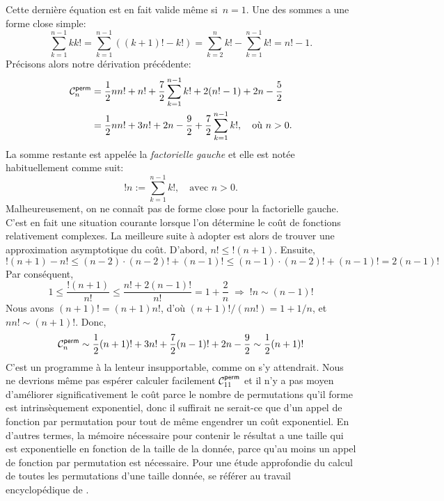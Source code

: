 Cette dernière équation est en fait valide même si~\(n = 1\). Une des
sommes a une forme close simple:
\begin{equation*}
\sum_{k=1}^{n-1}{kk!} = \sum_{k=1}^{n-1}((k+1)! - k!) =
\sum_{k=2}^{n}{k!} - \sum_{k=1}^{n-1}{k!} = n! - 1.
\end{equation*}
Précisons alors notre dérivation précédente:
\begin{align*}
\C{\fun{perm}}{n}
  &= \frac{1}{2}{nn!} + n! + \frac{7}{2}\sum_{k=1}^{n-1}{k!}
     + 2(n! - 1) + 2n - \frac{5}{2}\\
  &= \frac{1}{2}{nn!} + 3n!
     + 2n - \frac{9}{2} + \frac{7}{2}\sum_{k=1}^{n-1}{k!},\quad
     \text{où \(n > 0\)}.
\end{align*}
La somme restante est appelée la \emph{factorielle gauche}
\citep{Kurepa_1971} et elle est notée
habituellement comme suit:
\begin{equation*}
!n := \sum_{k=1}^{n-1}{k!},\quad \text{avec \(n > 0\)}.
\end{equation*}
Malheureusement, on ne connaît pas de forme close pour la factorielle
gauche.  C'est en fait une situation courante lorsque l'on détermine
le coût de fonctions relativement complexes. La meilleure suite à
adopter est alors de trouver une approximation asymptotique du
coût. D'abord, \(n!  \leqslant !(n+1)\). Ensuite,
\begin{equation*}
!(n+1) - n! \leqslant (n-2) \cdot (n-2)! + (n-1)! \leqslant
(n-1) \cdot (n-2)! + (n-1)! = 2 (n-1)!
\end{equation*}
Par conséquent,
\begin{equation*}
1 \leqslant \frac{!(n+1)}{n!} \leqslant \frac{n! + 2(n-1)!}{n!} = 1 +
\frac{2}{n} \;\Rightarrow\; !n \sim (n-1)!
\end{equation*}
Nous avons \((n+1)! = (n+1)n!\), d'où \((n+1)!/(nn!) = 1 + 1/n\), et
\(nn!  \sim (n+1)!\). Donc,
\begin{equation*}
\abovedisplayshortskip=0pt
\abovedisplayskip=0pt
\C{\fun{perm}}{n} \sim \frac{1}{2}(n+1)! + 3n! + \frac{7}{2}(n-1)!
+ 2n - \frac{9}{2} \sim \frac{1}{2}(n+1)!
\end{equation*}
C'est un programme à la lenteur insupportable, comme on s'y
attendrait. Nous ne devrions même pas espérer calculer facilement
\(\C{\fun{perm}}{11}\)  et il n'y a
pas moyen d'améliorer significativement le coût parce le nombre de
permutations qu'il forme est intrinsèquement exponentiel, donc il
suffirait ne serait-ce que d'un appel de fonction par permutation pour
tout de même engendrer un coût exponentiel. En d'autres termes, la
mémoire nécessaire pour contenir le résultat a une taille qui est
exponentielle en fonction de la taille de la donnée, parce qu'au moins
un appel de fonction par permutation est nécessaire. Pour une étude
approfondie du calcul de toutes les permutations d'une taille donnée,
se référer au travail encyclopédique de \cite{Knuth_2011}.

